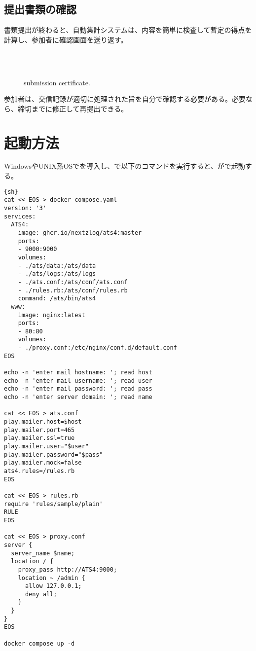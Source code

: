 \documentclass[10pt,a4paper]{book}
\begin{document}
\section{提出書類の確認}

書類提出が終わると、自動集計システムは、内容を簡単に検査して暫定の得点を計算し、参加者に確認画面を送り返す。

\begin{figure}[H]
\centering
{}\\
\\
\caption{submission certificate.}
\end{figure}

参加者は、交信記録が適切に処理された旨を自分で確認する必要がある。必要なら、締切までに修正して再提出できる。

\chapter{起動方法}

WindowsやUNIX系OSで\dock{}を導入し、\bash{}で以下のコマンドを実行すると、が\host{}で起動する。

\begin{Verbatim}{sh}
cat << EOS > docker-compose.yaml
version: '3'
services:
  ATS4:
    image: ghcr.io/nextzlog/ats4:master
    ports:
    - 9000:9000
    volumes:
    - ./ats/data:/ats/data
    - ./ats/logs:/ats/logs
    - ./ats.conf:/ats/conf/ats.conf
    - ./rules.rb:/ats/conf/rules.rb
    command: /ats/bin/ats4
  www:
    image: nginx:latest
    ports:
    - 80:80
    volumes:
    - ./proxy.conf:/etc/nginx/conf.d/default.conf
EOS

echo -n 'enter mail hostname: '; read host
echo -n 'enter mail username: '; read user
echo -n 'enter mail password: '; read pass
echo -n 'enter server domain: '; read name

cat << EOS > ats.conf
play.mailer.host=$host
play.mailer.port=465
play.mailer.ssl=true
play.mailer.user="$user"
play.mailer.password="$pass"
play.mailer.mock=false
ats4.rules=/rules.rb
EOS

cat << EOS > rules.rb
require 'rules/sample/plain'
RULE
EOS

cat << EOS > proxy.conf
server {
  server_name $name;
  location / {
    proxy_pass http://ATS4:9000;
    location ~ /admin {
      allow 127.0.0.1;
      deny all;
    }
  }
}
EOS

docker compose up -d
\end{Verbatim}
\end{document}
